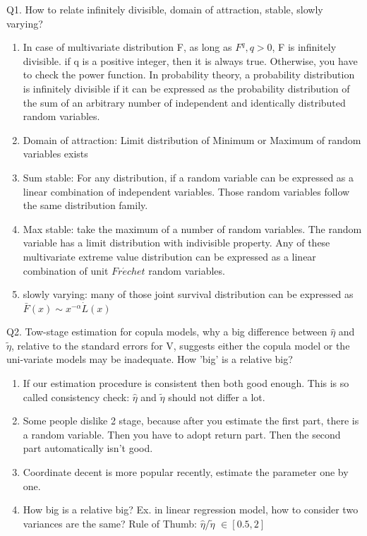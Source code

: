 \documentclass[a4paper,12pt]{texMemo}
\begin{document}
\maketitle %
Q1. How to relate infinitely divisible, domain of attraction, stable, slowly varying?
\begin{enumerate}
\item In case of multivariate distribution F, as long as $F^q, q>0$, F is infinitely divisible. if q is a positive integer, then it is always true. Otherwise, you have to check the power function.
In probability theory, a probability distribution is infinitely divisible if it can be expressed as the probability distribution of the sum of an arbitrary number of independent and identically distributed random variables. 
\item Domain of attraction: Limit distribution of Minimum or Maximum of random variables exists
\item Sum stable: For any distribution, if a random variable can be expressed as a linear combination of independent variables. Those random variables follow the same distribution family.
\item Max stable: take the maximum of a number of random variables. The random variable has a limit distribution with indivisible property. Any of these multivariate extreme value distribution can be expressed as a linear combination of unit $Fr\acute{e}chet$ random variables.
\item slowly varying: many of those joint survival distribution can be expressed as $\bar{F}(x) \sim x^{-\alpha}\dot L(x)$
\end{enumerate}

Q2. Tow-stage estimation for copula models, why a big difference between $\hat{\eta}$ and $\tilde{\eta}$, relative to the standard errors for V, suggests either the copula model or the uni-variate models may be inadequate. How 'big' is a relative big?
\begin{enumerate}
\item If our estimation procedure is consistent then both good enough. This is so called consistency check: $\hat{\eta}$ and $\tilde{\eta}$ should not differ a lot.
\item Some people dislike 2 stage, because after you estimate the first part, there is a random variable. Then you have to adopt return part. Then the second part automatically isn't good.
\item Coordinate decent is more popular recently, estimate the parameter one by one. 
\item How big is a relative big? Ex. in linear regression model, how to consider two variances are the same? Rule of Thumb: $\hat{\eta}$/$\tilde{\eta}$ $\in [0.5, 2]$
\end{enumerate}
\end{document}
